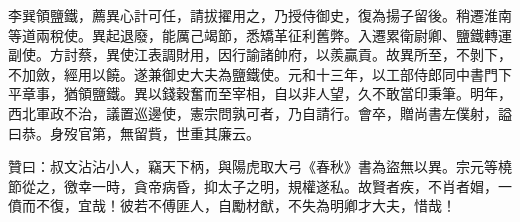 \begin{pinyinscope}
 李巽領鹽鐵，薦異心計可任，請拔擢用之，乃授侍御史，復為揚子留後。稍遷淮南等道兩稅使。異起退廢，能厲己竭節，悉矯革征利舊弊。入遷累衛尉卿、鹽鐵轉運副使。方討蔡，異使江表調財用，因行諭諸帥府，以羨贏貢。故異所至，不剝下，不加斂，經用以饒。遂兼御史大夫為鹽鐵使。元和十三年，以工部侍郎同中書門下平章事，猶領鹽鐵。異以錢穀奮而至宰相，自以非人望，久不敢當印秉筆。明年，西北軍政不治，議置巡邊使，憲宗問孰可者，乃自請行。會卒，贈尚書左僕射，謚曰恭。身歿官第，無留貲，世重其廉云。



 贊曰：叔文沾沾小人，竊天下柄，與陽虎取大弓《春秋》書為盜無以異。宗元等橈節從之，徼幸一時，貪帝病昏，抑太子之明，規權遂私。故賢者疾，不肖者媢，一僨而不復，宜哉！彼若不傅匪人，自勵材猷，不失為明卿才大夫，惜哉！



\end{pinyinscope}